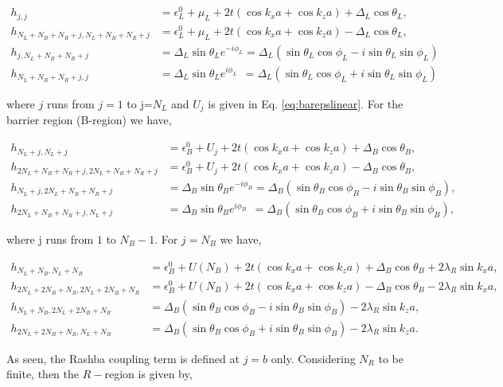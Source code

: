\documentclass[10pt,prb,showpacs,amssymb,floatfix]{revtex4-1}
\newcommand{\Dlt}{\Delta}
\newcommand{\eps}{\epsilon}
\newcommand{\lam}{\lambda}
\begin{document}
\begin{align}
h_{j,j}&= \eps^0_L + \mu_L + 2t(\cos k_x a + \cos k_z a) + \Dlt_L \cos\theta_L, \\
h_{N_L+N_B+N_R+j,N_L+N_B+N_R+j} &= \eps^0_L + \mu_L + 2t(\cos k_x a + \cos k_z a) - \Dlt_L \cos\theta_L, \\
h_{j, N_L+N_B+N_R+j} &= \Dlt_L \sin\theta_L e^{-i\phi_L } = \Dlt_L  (\sin\theta_L\cos\phi_L - i\sin\theta_L\sin\phi_L) \\
h_{N_L+N_B+N_R+j, j} &= \Dlt_L \sin\theta_L e^{i\phi_L }~~ = \Dlt_L  (\sin\theta_L\cos\phi_L + i\sin\theta_L\sin\phi_L) 
\end{align}

where $j$ runs from $j=1$ to j=$N_L$ and $U_j$ is given in Eq. \eqref{eq:barepslinear}.  For the barrier region (B-region) we have,

\begin{align}
h_{N_L+j, N_L+j}&= \eps^0_B + U_j  + 2t(\cos k_x a + \cos k_z a) + \Dlt_B \cos\theta_B, \\
h_{2N_L+N_B+N_R+j,2N_L+N_B+N_R+j} &= \eps^0_B  + U_j  + 2t(\cos k_x a + \cos k_z a) - \Dlt_B \cos\theta_B, \\
h_{N_L+j, 2N_L+N_B+N_R+j} &= \Dlt_B \sin\theta_B e^{-i\phi_B } = \Dlt_B  (\sin\theta_B\cos\phi_B - i\sin\theta_B\sin\phi_B), \\
h_{2N_L+N_B+N_R+j, N_L+j} &= \Dlt_B \sin\theta_B e^{i\phi_B }~~ = \Dlt_B  (\sin\theta_B\cos\phi_B + i\sin\theta_B\sin\phi_B), 
\end{align}

where j runs from $1$ to $N_B-1$. For $j=N_B$ we have,

\begin{align}
h_{N_L+N_B, N_L+N_B}&= \eps^0_B + U(N_B)  + 2t(\cos k_x a + \cos k_z a) + \Dlt_B \cos\theta_B + 2\lam_R \sin k_x a, \\
h_{2N_L+2N_B+N_R,2N_L+2N_B+N_R} &= \eps^0_B  + U(N_B)  + 2t(\cos k_x a + \cos k_z a) - \Dlt_B \cos\theta_B -  2\lam_R \sin k_x a,\\
h_{N_L+N_B, 2N_L+2N_B+N_R} &=  \Dlt_B  (\sin\theta_B\cos\phi_B - i\sin\theta_B\sin\phi_B) -  2\lam_R \sin k_z a, \\
h_{2N_L+2N_B+N_R, N_L+N_B} &=  \Dlt_B  (\sin\theta_B\cos\phi_B + i\sin\theta_B\sin\phi_B) -  2\lam_R \sin k_z a. 
\end{align}

As seen, the Rashba coupling term is defined at $j=b$ only. Considering $N_R$ to be finite, then the $R-$region is given by,
\end{document}
